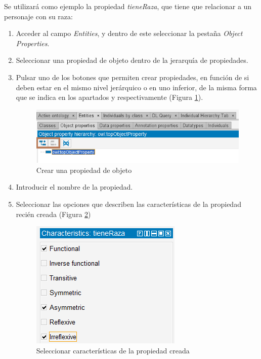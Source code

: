 Se utilizará como ejemplo la propiedad 
\textit{tieneRaza}, que tiene que relacionar a un personaje con su raza:
\begin{enumerate}
    \item Acceder al campo \textit{Entities}, y dentro de este seleccionar la pestaña \textit{Object Properties}.
    \item Seleccionar una propiedad de objeto dentro de la jerarquía de propiedades.
    \item Pulsar uno de los botones que permiten crear propiedades, en función de si deben estar en el mismo nivel jerárquico o 
    en uno inferior, de la misma forma que se indica en los apartados  y 
    respectivamente (Figura \ref*{CreateObjProp_1}).
    
    \begin{figure}[ht]
        \centering
        \includegraphics[scale=0.6]{Figures/Protege/CreateObjProp_1.png}
        \caption{Crear una propiedad de objeto}
        \label{CreateObjProp_1}
    \end{figure}

    \item Introducir el nombre de la propiedad.
    \item Seleccionar las opciones que describen las características de la propiedad recién creada (Figura \ref*{CreateObjProp_2})
    \begin{figure}[H]
        \centering
        \includegraphics[scale=0.6]{Figures/Protege/CreateObjProp_2.png}
        \caption{Seleccionar características de la propiedad creada}
        \label{CreateObjProp_2}
    \end{figure}


\end{enumerate}
